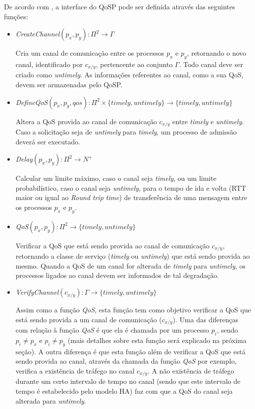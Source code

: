 	De acordo com \cite{GORENDER05}, a interface do QoSP pode ser definida através das seguintes funções:
	
\begin{itemize}
\item \textit{CreateChannel}$(p_{x},p_{y}):\Pi^{2}\rightarrow\Gamma$
	
	Cria um canal de comunicação entre os processos $p_{x}$ e $p_{y}$, retornando o novo canal, identificado por $c_{x/y}$, pertencente ao conjunto $\Gamma$. Todo canal deve ser criado como \textit{untimely}. As informações referentes ao canal, como a sua QoS, devem ser armazenadas pelo QoSP.
	
\item \textit{DefineQoS}$(p_{x}, p_{y}, \textit{qos}):\Pi^{2}\times\lbrace\textit{timely},\textit{untimely}\rbrace\rightarrow\lbrace\textit{timely},\textit{untimely}\rbrace$
	
	Altera a QoS provida ao canal de comunicação $c_{x/y}$ entre \textit{timely} e \textit{untimely}. Caso a solicitação seja de \textit{untimely} para \textit{timely}, um processo de admissão deverá ser executado.
	
\item \textit{Delay}$(p_{x}, p_{y}):\Pi^{2}\rightarrow N^{+}$
	
	Calcular um limite máximo, caso o canal seja \textit{timely}, ou um limite probabilístico, caso o canal seja \textit{untimely}, para o tempo de ida e volta (RTT maior ou igual ao \textit{Round trip time}) de transferência de uma mensagem entre os processos $p_{x}$ e $p_{y}$.
	
\item \textit{QoS}$(p_{x}, p_{y}):\Pi^{2}\rightarrow\lbrace\textit{timely},\textit{untimely}\rbrace$
	
	Verificar a QoS que está sendo provida ao canal de comunicação $c_{x/y}$, retornando a classe de serviço (\textit{timely} ou \textit{untimely}) que está sendo provida ao mesmo. Quando a QoS de um canal for alterada de \textit{timely} para \textit{untimely}, os processos ligados ao canal devem ser informados de tal degradação.
	
\item \textit{VerifyChannel}$(c_{x/y}):\Gamma\rightarrow\lbrace\textit{timely},\textit{untimely}\rbrace$
	
	Assim como a função \textit{QoS}, esta função tem como objetivo verificar a QoS que está sendo provida a um canal de comunicação ($c_{x/y}$). Uma das diferenças com relação à função \textit{QoS} é que ela é chamada por um processo $p_{i}$, sendo $p_{i} \neq p_{x}$ e $p_{i} \neq p_{y}$ (mais detalhes sobre esta função será explicado na próxima seção). A outra diferença é que esta função além de verificar a QoS que está sendo provida ao canal, através da chamada da função \textit{QoS} por exemplo, verifica a existência de tráfego no canal $c_{x/y}$. A não existência de tráfego durante um certo intervalo de tempo no canal (sendo que este intervalo de tempo é estabelecido pelo modelo HA) faz com que a QoS do canal seja alterada para \textit{untimely}.

\end{itemize}

